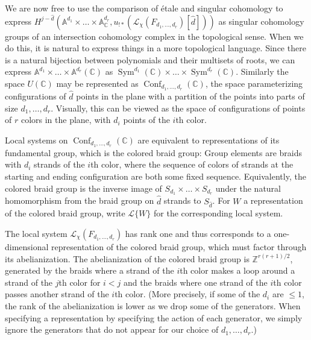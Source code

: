\documentclass[11pt,letterpaper]{article}
\theoremstyle{definition}
\theoremstyle{remark}
\numberwithin{equation}{section}
\theoremstyle{dotless}
\begin{document}
We are now free to use the comparison of \'{e}tale and singular cohomology to express $H^{j-\hat{d}} ( \mathbb A^{d_1 } \times \dots \times \mathbb A^{d_r }_{\mathbb C},   {u} _{!*}   (\mathcal L_{\chi}(F_{d_1,\dots,d_r}) [\hat{d}]))$ as singular cohomology groups of an intersection cohomology complex in the topological sense. When we do this, it is natural to express things in a more topological language. Since there is a natural bijection between polynomials and their multisets of roots, we can express $\mathbb A^{d_1 } \times \dots \times \mathbb A^{d_r }(\mathbb C)$ as $\operatorname{Sym}^{d_1} (\mathbb C) \times \dots \times \operatorname{Sym}^{d_r}(\mathbb C)$. Similarly the space $U(\mathbb C)$ may be represented as $\operatorname{Conf}_{d_1,\dots, d_r} (\mathbb C)$, the space parameterizing configurations of $\hat{d}$ points in the plane with a partition of the points into parts of size $d_1,\dots, d_r$. Visually, this can be viewed as the space of configurations of points of $r$ colors in the plane, with $d_i$ points of the $i$th color.

Local systems on $\operatorname{Conf}_{d_1,\dots, d_r} (\mathbb C) $ are equivalent to representations of its fundamental group, which is the colored braid group: Group elements are braids with $d_i$ strands of the $i$th color, where the sequence of colors of strands at the starting and ending configuration are both some fixed sequence. Equivalently, the colored braid group is the inverse image of $S_{d_1} \times \dots \times S_{d_r}$ under the natural homomorphism from the braid group on $\hat{d}$ strands to $S_{\hat{d}}$.  For $W$ a representation of the colored braid group, write $\mathcal L\{W\}$ for the corresponding local system.


The local system $\mathcal L_{\chi}(F_{d_1,\dots,d_r})$ has rank one and thus corresponds to a one-dimensional representation of the colored braid group, which must factor through its abelianization. The abelianization of the colored braid group is $\mathbb Z^{r (r+1)/2}$, generated by the braids where a strand of the $i$th color makes a loop around a strand of the $j$th color for $i<j$ and the braids where one strand of the $i$th color passes another strand of the $i$th color. (More precisely, if some of the $d_i$ are $\leq 1$, the rank of the abelianization is lower as we drop some of the generators. When specifying a representation by specifying the action of each generator, we simply ignore the generators that do not appear for our choice of $d_1,\dots,d_r$.)
\end{document}
